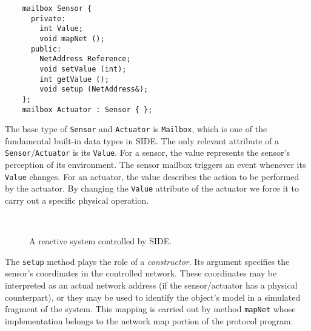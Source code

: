 {\small\begin{verbatim}
    mailbox Sensor {
      private:
        int Value;
        void mapNet ();
      public:
        NetAddress Reference;
        void setValue (int);
        int getValue ();
        void setup (NetAddress&);
    };
    mailbox Actuator : Sensor { };
\end{verbatim}}

The base type of {\tt Sensor} and {\tt Actuator} is {\tt Mailbox}, which
is one of the fundamental built-in data types in SIDE.
The only relevant attribute of a {\tt Sensor}/{\tt Actuator} is its
{\tt Value}.
For a sensor, the value represents the sensor's perception of its environment.
The sensor mailbox triggers an event whenever its {\tt Value} changes.
For an actuator, the value describes the action to be performed by the
actuator.
By changing the {\tt Value} attribute of the actuator we force it to
carry out a specific physical operation.

\begin{figure}[htbp]%
\begin{center}
\ 
\vspace{0.75cm}
\caption{A reactive system controlled by SIDE.\label{fig.reacts}}
\end{center}
\end{figure}%

The {\tt setup} method plays the role of a {\em constructor}.
Its argument specifies the sensor's coordinates in
the controlled network.
These coordinates may be interpreted
as an actual network address (if the
sensor/actuator has a physical counterpart), or they may be used to identify
the object's model in a simulated fragment of the system.
This mapping is carried out by method {\tt mapNet} whose
implementation belongs to the network map portion of the protocol program.

